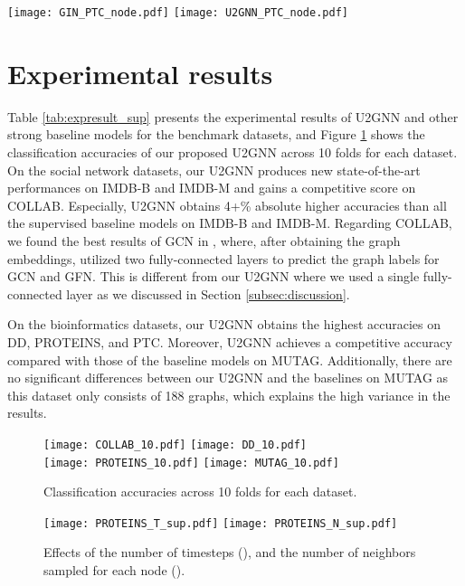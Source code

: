 \documentclass[twoside,leqno,twocolumn]{article}
\newcommand{\citet}{\cite}
\newcommand{\citep}{\cite}
\begin{document}
\begin{figure*}[ht]
\centering
    \texttt{[image: GIN\_PTC\_node.pdf]}
    \texttt{[image: U2GNN\_PTC\_node.pdf]}
\caption[short]{A t-SNE visualization of the node embeddings learned by GIN-0 and our U2GNN on the PTC dataset.}
\label{fig:visualembeddings}
\end{figure*}

\section{Experimental results} 
\label{subsec:expresults}

Table \ref{tab:expresult_sup} presents the experimental results of U2GNN and other strong baseline models for the benchmark datasets,
and Figure \ref{fig:resultsof10folds} shows the classification accuracies of our proposed U2GNN across 10 folds for each dataset.
On the social network datasets, our U2GNN produces new state-of-the-art performances on IMDB-B and IMDB-M and gains a competitive score on COLLAB.
Especially, U2GNN obtains 4+\% absolute higher accuracies than all the supervised baseline models on IMDB-B and IMDB-M.
Regarding COLLAB, we found the best results of GCN in \citep{Chen2019ArePG}, where, after obtaining the graph embeddings, \citet{Chen2019ArePG} utilized two fully-connected layers to predict the graph labels for GCN and GFN. 
This is different from our U2GNN where we used a single fully-connected layer as we discussed in Section \ref{subsec:discussion}.


On the bioinformatics datasets, our U2GNN obtains the highest accuracies on DD, PROTEINS, and PTC. 
Moreover, U2GNN achieves a competitive accuracy compared with those of the baseline models on MUTAG. 
Additionally, there are no significant differences between our U2GNN and the baselines on MUTAG as this dataset only consists of 188 graphs, which explains the high variance in the results.

\begin{figure}[ht]
\centering
    \texttt{[image: COLLAB\_10.pdf]}
\texttt{[image: DD\_10.pdf]}\\
    \texttt{[image: PROTEINS\_10.pdf]}
    \texttt{[image: MUTAG\_10.pdf]}
\caption[short]{Classification accuracies across 10 folds for each dataset.}
\label{fig:resultsof10folds}
\end{figure}


\begin{figure}[!ht]
\centering
    \texttt{[image: PROTEINS\_T\_sup.pdf]}
    \texttt{[image: PROTEINS\_N\_sup.pdf]}
\caption[short]{Effects of the number of timesteps (), and the number of neighbors sampled for each node ().}
\label{fig:effectTN_PROTEINS}
\end{figure}
\end{document}

